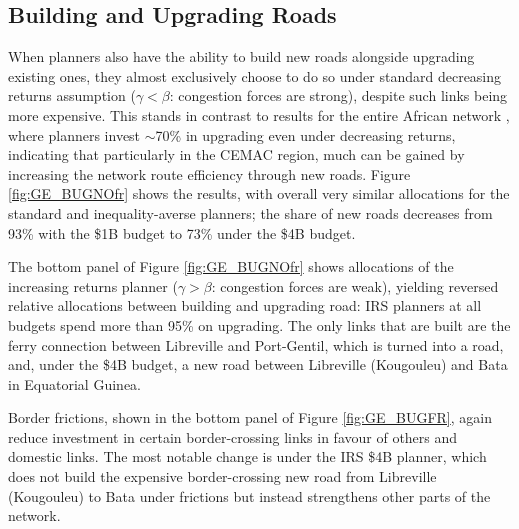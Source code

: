 \documentclass[a4paper]{article}
\begin{document}
\subsection{Building and Upgrading Roads} 

When planners also have the ability to build new roads alongside upgrading existing ones, they almost exclusively choose to do so under standard decreasing returns assumption ($\gamma < \beta$: congestion forces are strong), despite such links being more expensive. This stands in contrast to results for the entire African network \citep{krantz2024optimal}, where planners invest $\sim$70\% in upgrading even under decreasing returns, indicating that particularly in the CEMAC region, much can be gained by increasing the network route efficiency through new roads. Figure \ref{fig:GE_BUGNOfr} shows the results, with overall very similar allocations for the standard and inequality-averse planners; the share of new roads decreases from 93\% with the \$1B budget to 73\% under the \$4B budget. \newline 

The bottom panel of Figure \ref{fig:GE_BUGNOfr} shows allocations of the increasing returns planner ($\gamma > \beta$: congestion forces are weak), yielding reversed relative allocations between building and upgrading road: IRS planners at all budgets spend more than 95\% on upgrading. The only links that are built are the ferry connection between Libreville and Port-Gentil, which is turned into a road, and, under the \$4B budget, a new road between Libreville (Kougouleu) and Bata in Equatorial Guinea. \newline

Border frictions, shown in the bottom panel of Figure \ref{fig:GE_BUGFR}, again reduce investment in certain border-crossing links in favour of others and domestic links. The most notable change is under the IRS \$4B planner, which does not build the expensive border-crossing new road from Libreville (Kougouleu) to Bata under frictions but instead strengthens other parts of the network. 
\end{document}
